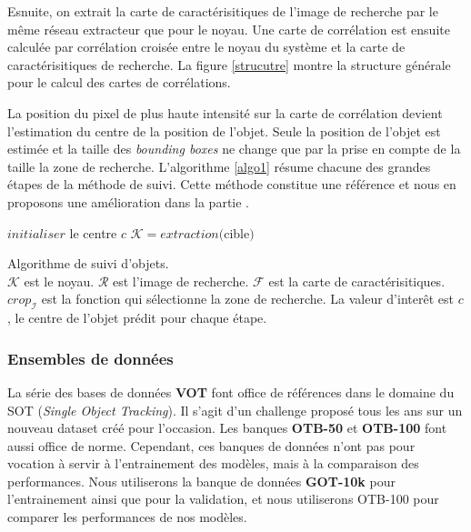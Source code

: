 \documentclass[10pt,twocolumn,letterpaper,french]{article}
\begin{document}
Esnuite, on extrait la carte de caractérisitiques de l'image de recherche par le même réseau extracteur que pour le noyau. Une carte de corrélation est ensuite calculée par corrélation croisée entre le noyau du système et la carte de caractérisitiques de recherche. La figure \ref{strucutre} montre la structure générale pour le calcul des cartes de corrélations.

La position du pixel de plus haute intensité sur la carte de corrélation devient l'estimation du centre de la position de l'objet. Seule la position de l'objet est estimée et la taille des \textit{bounding boxes} ne change que par la prise en compte de la taille la zone de recherche. L'algorithme \ref{algo1} résume chacune des grandes étapes de la méthode de suivi. Cette méthode constitue une référence et nous en proposons une amélioration dans la partie \textit{}.


\begin{algorithm}
\SetAlgoLined
 $initialiser$ le centre $c$\;
 $\mathcal{K} = extraction($cible$)$\;
\caption{Algorithme de suivi d'objets.\\$\mathcal{K}$ est le noyau. $\mathcal{R}$ est l'image de recherche. $\mathcal{F}$ est la carte de caractérisitiques. $crop_{\mathcal{I}}$ est la fonction qui sélectionne la zone de recherche. La valeur d'interêt est $c$, le centre de l'objet prédit pour chaque étape.}
\label{algo1}
\end{algorithm}




\subsubsection*{Ensembles de données}

La série des bases de données \textbf{VOT} \cite{VOT} font office de références dans le domaine du SOT (\textit{Single Object Tracking}). Il s'agit d'un challenge proposé tous les ans sur un nouveau dataset créé pour l'occasion. Les banques \textbf{OTB-50} et \textbf{OTB-100} \cite{OTB} font aussi office de norme. Cependant, ces banques de données n'ont pas pour vocation à servir à l'entrainement des modèles, mais à la comparaison des performances. Nous utiliserons la banque de données \textbf{GOT-10k} \cite{GOT10K} pour l'entrainement ainsi que pour la validation, et nous utiliserons OTB-100 pour comparer les performances de nos modèles.
\end{document}
